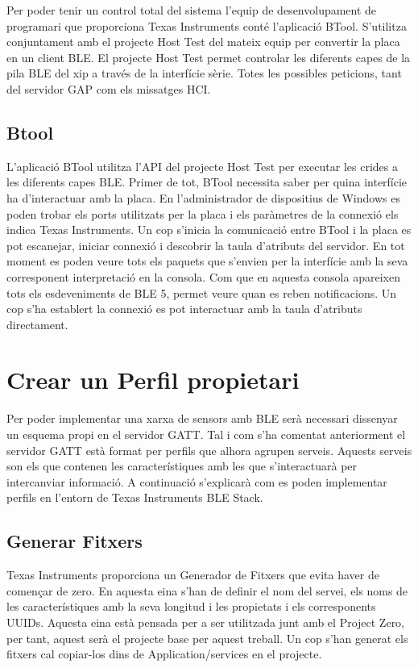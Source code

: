 Per poder tenir un control total del sistema l'equip de desenvolupament de programari que proporciona Texas Instruments conté l'aplicació BTool.
S'utilitza conjuntament amb el projecte Host Test del mateix equip per convertir la placa en un client BLE.
El projecte Host Test permet controlar les diferents capes de la pila BLE del xip a través de la interfície sèrie.
Totes les possibles peticions, tant del servidor GAP com els missatges HCI.

\subsection{Btool}
L'aplicació BTool utilitza l'API del projecte Host Test per executar les crides a les diferents capes BLE.
Primer de tot, BTool necessita saber per quina interfície ha d'interactuar amb la placa.
En l'administrador de dispositius de Windows es poden trobar els ports utilitzats per la placa i els paràmetres de la connexió els indica Texas Instruments\cite{serial_params}.
Un cop s'inicia la comunicació entre BTool i la placa es pot escanejar, iniciar connexió i descobrir la taula d'atributs del servidor.
En tot moment es poden veure tots els paquets que s'envien per la interfície amb la seva corresponent interpretació en la consola.
Com que en aquesta consola apareixen tots els esdeveniments de BLE 5, permet veure quan es reben notificacions.
Un cop s'ha establert la connexió es pot interactuar amb la taula d'atributs directament.


\section{Crear un Perfil propietari}

Per poder implementar una xarxa de sensors amb BLE serà necessari dissenyar un esquema propi en el servidor GATT.
Tal i com s'ha comentat anteriorment el servidor GATT està format per perfils que alhora agrupen serveis.
Aquests serveis son els que contenen les característiques amb les que s'interactuarà per intercanviar informació.
A continuació s'explicarà com es poden implementar perfils en l'entorn de Texas Instruments BLE Stack.

\subsection{Generar Fitxers}
Texas Instruments proporciona un Generador de Fitxers \cite{Service_Generator} que evita haver de començar de zero.
En aquesta eina s'han de definir el nom del servei, els noms de les característiques amb la seva longitud i les propietats i els corresponents UUIDs.
Aquesta eina està pensada per a ser utilitzada junt amb el Project Zero, per tant, aquest serà el projecte base per aquest treball.
Un cop s'han generat els fitxers cal copiar-los dins de Application/services en el projecte.

